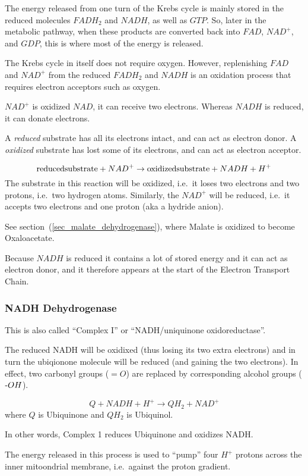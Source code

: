 \documentclass{article}
\def\mhyphen{{\hbox{-}}}
\begin{document}
The energy released from one turn of the Krebs cycle is mainly stored in the reduced
molecules $FADH_2$ and $NADH$, as well as $GTP$. So, later in the metabolic pathway, when
these products are converted back into $FAD$, $NAD^+$, and $GDP$, this is where most of
the energy is released.

The Krebs cycle in itself does not require oxygen. However, replenishing $FAD$ and $NAD^+$
from the reduced $FADH_2$ and $NADH$ is an oxidation process that requires electron
acceptors such as oxygen.

$NAD^+$ is oxidized $NAD$, it can receive two electrons.
Whereas $NADH$ is reduced, it can donate electrons.

A {\em reduced\/} substrate has all its electrons intact, and can act as electron donor.
A {\em oxidized\/} substrate has lost some of its electrons, and can act as electron
acceptor.

\[
    {\rm reduced substrate} + NAD^+ \rightarrow {\rm oxidized substrate} + NADH + H^+
\]
The substrate in this reaction will be oxidized, i.e.\ it loses two electrons and two
protons, i.e.\ two hydrogen atoms. Similarly, the $NAD^+$ will be reduced, i.e.\ it
accepts two electrons and one proton (aka a hydride anion).

See section~(\ref{sec_malate_dehydrogenase}), where Malate is oxidized to become
Oxaloacetate.

Because $NADH$ is reduced it contains a lot of stored energy and it can act as electron
donor, and it therefore appears at the start of the Electron Transport Chain.

\subsubsection{NADH Dehydrogenase}
This is also called ``Complex I'' or ``NADH/uniquinone oxidoreductase''.

The reduced NADH will be oxidixed (thus losing its two extra electrons) and in turn
the ubiqionone molecule will be reduced (and gaining the two electrons).
In effect, two carbonyl groups ($=O$) are replaced by corresponding alcohol groups
(${\mhyphen}OH$).

\[
    Q + NADH + H^+ \rightarrow QH_2 + NAD^+
\]
where $Q$ is Ubiquinone and $QH_2$ is Ubiquinol.

In other words, Complex 1 reduces Ubiquinone and oxidizes NADH\@.

The energy released in this process is used to ``pump'' four $H^+$ protons across the
inner mitoondrial membrane, i.e.\ against the proton gradient.
\end{document}
